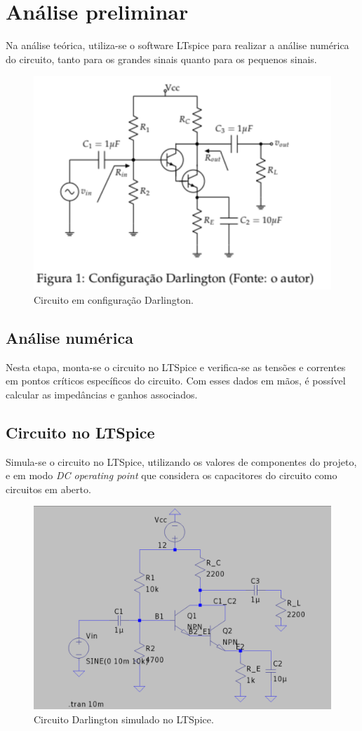 \section{Análise preliminar}

Na análise teórica, utiliza-se o software LTspice para realizar a análise numérica do circuito, tanto para os grandes sinais quanto para os pequenos sinais.

\begin{figure}[h]
    \centering
    \includegraphics[width=0.5\columnwidth]{Images/o_circuito.png}
    \caption{Circuito em configuração Darlington.}
\end{figure}

\subsection{Análise numérica}

Nesta etapa, monta-se o circuito no LTSpice e verifica-se as tensões e correntes em pontos críticos específicos do circuito. Com esses dados em mãos, é possível calcular as impedâncias e ganhos associados.

\subsection{Circuito no LTSpice}

Simula-se o circuito no LTSpice, utilizando os valores de componentes do projeto, e em modo \emph{DC operating point} que considera os capacitores do circuito como circuitos em aberto.

\begin{figure}[H]
    \centering
    \includegraphics[width=0.5\columnwidth]{Images/o_circuito_ltspice.png}
    \caption{Circuito Darlington simulado no LTSpice.}
\end{figure}

